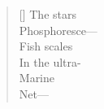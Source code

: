 \label{ch:above_the_airstrip}
\begin{verse}[\versewidth]
The stars\\
\hspace*{3\vgap} Phosphoresce---\\
Fish scales\\
\hspace*{3\vgap} In the ultra-\\
\hspace*{4\vgap} Marine\\
Net---
\end{verse}
